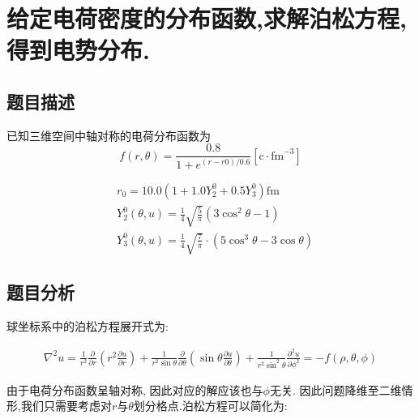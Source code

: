 


\chapter{给定电荷密度的分布函数,求解泊松方程,得到电势分布.}

\section{题目描述}

已知三维空间中轴对称的电荷分布函数为
\begin{equation}
f(r,\theta)=\frac { 0.8 } { 1 + e ^ { ( r - r 0 ) / 0.6 } } \left[ \mathrm { c } \cdot \mathrm { fm } ^ { - 3 } \right]
\end{equation}

\begin{align}
&r _ 0 = 10.0 \left( 1 + 1.0 Y _ { 2 } ^0+ 0.5 Y _ { 3 }^0 \right) \mathrm { fm }\\
&{ Y _ { 2 } ^ { 0 } ( \theta , u ) = \frac { 1 } { 4 } \sqrt { \frac { 5 } { \pi } } \left( 3 \cos ^ { 2 } \theta - 1 \right) } \\ 
&{ Y _ { 3 } ^ { 0 } ( \theta , u ) = \frac { 1 } { 4 } \sqrt { \frac { 7 } { \pi } } \cdot \left( 5 \cos ^ { 3 } \theta - 3 \cos \theta \right) }
\end{align}

\section{题目分析}

球坐标系中的泊松方程展开式为:

\begin{align}
\nabla ^ { 2 } u = \frac { 1 } { r ^ { 2 } } \frac { \partial } { \partial r } \left( r ^ { 2 } \frac { \partial u } { \partial r } \right) + \frac { 1 } { r ^ { 2 } \sin \theta } \frac { \partial } { \partial \theta } \left( \sin \theta \frac { \partial u } { \partial \theta } \right) + \frac { 1 } { r ^ { 2 } \sin ^ { 2 } \theta } \frac { \partial ^ { 2 } u } { \partial  \phi ^ { 2 } } = -f ( \rho , \theta , \phi )
\end{align}

由于电荷分布函数呈轴对称, 因此对应的解应该也与$\phi$无关. 因此问题降维至二维情形,我们只需要考虑对$r$与$\theta$划分格点.泊松方程可以简化为:

